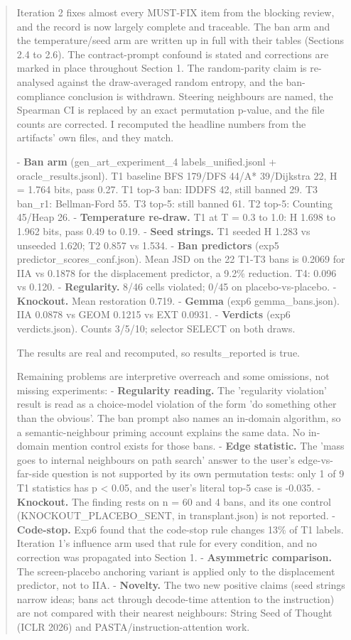 \documentclass[11pt,letterpaper]{article}
\begin{document}
\begin{quote}\small

Iteration 2 fixes almost every MUST-FIX item from the blocking review, and the record is now largely complete and traceable. The ban arm and the temperature/seed arm are written up in full with their tables (Sections 2.4 to 2.6). The contract-prompt confound is stated and corrections are marked in place throughout Section 1. The random-parity claim is re-analysed against the draw-averaged random entropy, and the ban-compliance conclusion is withdrawn. Steering neighbours are named, the Spearman CI is replaced by an exact permutation p-value, and the file counts are corrected. I recomputed the headline numbers from the artifacts' own files, and they match.

- \textbf{Ban arm} (gen\_art\_experiment\_4 labels\_unified.jsonl + oracle\_results.jsonl). T1 baseline BFS 179/DFS 44/A* 39/Dijkstra 22, H = 1.764 bits, pass 0.27. T1 top-3 ban: IDDFS 42, still banned 29. T3 ban\_r1: Bellman-Ford 55. T3 top-5: still banned 61. T2 top-5: Counting 45/Heap 26. - \textbf{Temperature re-draw.} T1 at T = 0.3 to 1.0: H 1.698 to 1.962 bits, pass 0.49 to 0.19. - \textbf{Seed strings.} T1 seeded H 1.283 vs unseeded 1.620; T2 0.857 vs 1.534. - \textbf{Ban predictors} (exp5 predictor\_scores\_conf.json). Mean JSD on the 22 T1-T3 bans is 0.2069 for IIA vs 0.1878 for the displacement predictor, a 9.2\% reduction. T4: 0.096 vs 0.120. - \textbf{Regularity.} 8/46 cells violated; 0/45 on placebo-vs-placebo. - \textbf{Knockout.} Mean restoration 0.719. - \textbf{Gemma} (exp6 gemma\_bans.json). IIA 0.0878 vs GEOM 0.1215 vs EXT 0.0931. - \textbf{Verdicts} (exp6 verdicts.json). Counts 3/5/10; selector SELECT on both draws.

The results are real and recomputed, so results\_reported is true.

Remaining problems are interpretive overreach and some omissions, not missing experiments: - \textbf{Regularity reading.} The 'regularity violation' result is read as a choice-model violation of the form 'do something other than the obvious'. The ban prompt also names an in-domain algorithm, so a semantic-neighbour priming account explains the same data. No in-domain mention control exists for those bans. - \textbf{Edge statistic.} The 'mass goes to internal neighbours on path search' answer to the user's edge-vs-far-side question is not supported by its own permutation tests: only 1 of 9 T1 statistics has p \textless{} 0.05, and the user's literal top-5 case is -0.035. - \textbf{Knockout.} The finding rests on n = 60 and 4 bans, and its one control (KNOCKOUT\_PLACEBO\_SENT, in transplant.json) is not reported. - \textbf{Code-stop.} Exp6 found that the code-stop rule changes 13\% of T1 labels. Iteration 1's influence arm used that rule for every condition, and no correction was propagated into Section 1. - \textbf{Asymmetric comparison.} The screen-placebo anchoring variant is applied only to the displacement predictor, not to IIA. - \textbf{Novelty.} The two new positive claims (seed strings narrow ideas; bans act through decode-time attention to the instruction) are not compared with their nearest neighbours: String Seed of Thought (ICLR 2026) and PASTA/instruction-attention work.


\end{quote}
\end{document}
